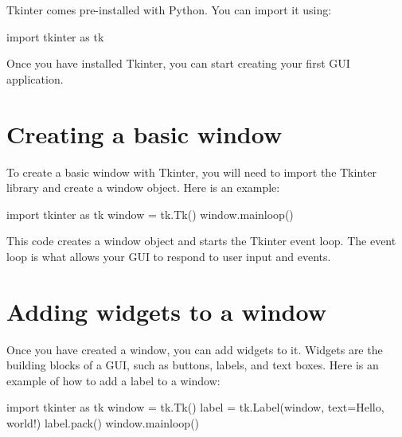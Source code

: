 \documentclass[11pt]{article}
\newenvironment{Shaded}{}{}
\newcommand{\StringTok}[1]{\textcolor[rgb]{0.25,0.44,0.63}{{#1}}}
\newcommand{\NormalTok}[1]{{#1}}
\newcommand{\ImportTok}[1]{{#1}}
\newcommand{\OperatorTok}[1]{\textcolor[rgb]{0.40,0.40,0.40}{{#1}}}
\begin{document}
Tkinter comes pre-installed with Python. You can import it using:

\begin{Shaded}
\begin{Highlighting}[]
\ImportTok{import}\NormalTok{ tkinter }\ImportTok{as}\NormalTok{ tk}
\end{Highlighting}
\end{Shaded}

Once you have installed Tkinter, you can start creating your first GUI
application.

\section{Creating a basic window}\label{creating-a-basic-window}

To create a basic window with Tkinter, you will need to import the
Tkinter library and create a window object. Here is an example:

\begin{Shaded}
\begin{Highlighting}[]
\ImportTok{import}\NormalTok{ tkinter }\ImportTok{as}\NormalTok{ tk}
\NormalTok{window }\OperatorTok{=}\NormalTok{ tk.Tk()}
\NormalTok{window.mainloop()}
\end{Highlighting}
\end{Shaded}

This code creates a window object and starts the Tkinter event loop. The
event loop is what allows your GUI to respond to user input and events.

\section{Adding widgets to a window}\label{adding-widgets-to-a-window}

Once you have created a window, you can add widgets to it. Widgets are
the building blocks of a GUI, such as buttons, labels, and text boxes.
Here is an example of how to add a label to a window:

\begin{Shaded}
\begin{Highlighting}[]
\ImportTok{import}\NormalTok{ tkinter }\ImportTok{as}\NormalTok{ tk}
\NormalTok{window }\OperatorTok{=}\NormalTok{ tk.Tk()}
\NormalTok{label }\OperatorTok{=}\NormalTok{ tk.Label(window, text}\OperatorTok{=}\StringTok{\textquotesingle{}Hello, world!\textquotesingle{}}\NormalTok{)}
\NormalTok{label.pack()}
\NormalTok{window.mainloop()}
\end{Highlighting}
\end{Shaded}
\end{document}
